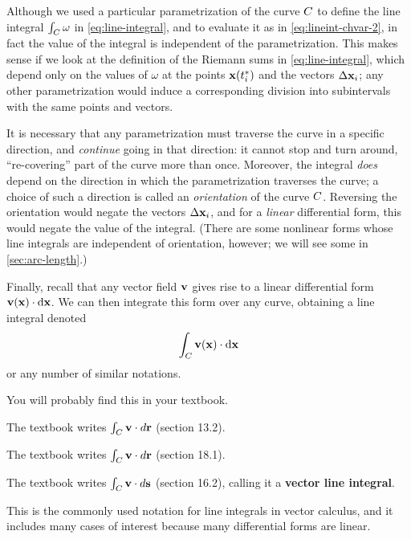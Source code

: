 \begin{rmk}\label{rmk:lineint-orientation}
  Although we used a particular parametrization of the curve $C$ to define the line integral $\int_{C} \omega$ in \cref{eq:line-integral}, and to evaluate it as in \cref{eq:lineint-chvar-2}, in fact the value of the integral is independent of the parametrization.
  This makes sense if we look at the definition of the Riemann sums in \cref{eq:line-integral}, which depend only on the values of $\omega$ at the points $\mathbf{x}({t}_{i}^*)$ and the vectors $\Delta \mathbf{x}_i$; any other parametrization would induce a corresponding division into subintervals with the same points and vectors.

  It is necessary that any parametrization must traverse the curve in a specific direction, and \emph{continue} going in that direction: it cannot stop and turn around, ``re-covering'' part of the curve more than once.
  Moreover, the integral \emph{does} depend on the direction in which the parametrization traverses the curve; a choice of such a direction is called an \emph{orientation} of the curve $C$.
  Reversing the orientation would negate the vectors $\Delta \mathbf{x}_i$, and for a \emph{linear} differential form, this would negate the value of the integral.
  (There are some nonlinear forms whose line integrals are independent of orientation, however; we will see some in \cref{sec:arc-length}.)
\end{rmk}

Finally, recall that any vector field $\mathbf{v}$ gives rise to a linear differential form $\mathbf{v}(\mathbf{x}) \cdot {\ensuremath{\mathrm{d} \mathbf{x}}}$.
We can then integrate this form over any curve, obtaining a line integral denoted
\[ \int_{C} \mathbf{v}(\mathbf{x}) \cdot {\ensuremath{\mathrm{d} \mathbf{x}}} \]
or any number of similar notations.
\begin{notextbook}You will probably find this in your textbook.\end{notextbook}%
\begin{stewart}The textbook writes $\int_{C} \mathbf{v} \cdot d\mathbf{r}$ (section 13.2).\end{stewart}%
\begin{hugheshallett}The textbook writes $\int_{C} \mathbf{v} \cdot d\mathbf{r}$ (section 18.1).\end{hugheshallett}%
\begin{rogawski}The textbook writes $\int_{C} \mathbf{v} \cdot d\mathbf{s}$ (section 16.2), calling it a \textbf{vector line integral}.\end{rogawski}
This is the commonly used notation for line integrals in vector calculus, and it includes many cases of interest because many differential forms are linear.


